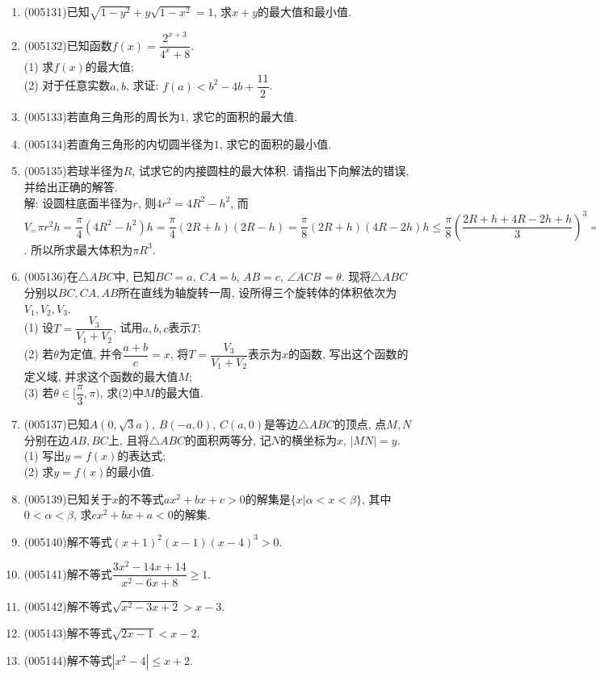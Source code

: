 \documentclass[10pt,a4paper]{article}
\begin{document}
\begin{enumerate}[1.]
\item {\tiny (005131)}已知$\sqrt{1-y^2}+y\sqrt{1-x^2}=1$, 求$x+y$的最大值和最小值.
\item {\tiny (005132)}已知函数$f(x)=\dfrac{2^{x+3}}{{4^x}+8}$.\\
(1) 求$f(x)$的最大值;\\
(2) 对于任意实数$a,b$, 求证: $f(a)<b^2-4b+\dfrac{11}2$.
\item {\tiny (005133)}若直角三角形的周长为$1$, 求它的面积的最大值.
\item {\tiny (005134)}若直角三角形的内切圆半径为$1$, 求它的面积的最小值.
\item {\tiny (005135)}若球半径为$R$, 试求它的内接圆柱的最大体积. 请指出下向解法的错误, 并给出正确的解答.\\
解: 设圆柱底面半径为$r$, 则$4r^2=4R^2-h^2$, 而$V_=\pi {r^2}h=\dfrac{\pi}4(4{R^2}-{h^2})h=\dfrac{\pi }4(2R+h)(2R-h)=\dfrac{\pi}8(2R+h)(4R-2h)h\le \dfrac{\pi}8(\dfrac{2R+h+4R-2h+h}3)^3=\dfrac{\pi}8(2R)^3=\pi R^3$. 所以所求最大体积为$\pi R^3$.
\item {\tiny (005136)}在$\triangle ABC$中, 已知$BC=a$, $CA=b$, $AB=c$, $\angle ACB=\theta$. 现将$\triangle ABC$分别以$BC,CA,AB$所在直线为轴旋转一周, 设所得三个旋转体的体积依次为$V_1,V_2,V_3$.\\
(1) 设$T=\dfrac{V_3}{V_1+V_2}$, 试用$a,b,c$表示$T$;\\
(2) 若$\theta$为定值, 并令$\dfrac{a+b}c=x$, 将$T=\dfrac{V_3}{V_1+V_2}$表示为$x$的函数, 写出这个函数的定义域, 并求这个函数的最大值$M$;\\
(3) 若$\theta \in [\dfrac{\pi }3,\pi)$, 求(2)中$M$的最大值.
\item {\tiny (005137)}已知$A(0,\sqrt 3a)$, $B(-a,0)$, $C(a,0)$是等边$\triangle ABC$的顶点, 点$M,N$分别在边$AB,BC$上, 且将$\triangle ABC$的面积两等分, 记$N$的横坐标为$x$, $|MN|=y$.\\
(1) 写出$y=f(x)$的表达式;\\
(2) 求$y=f(x)$的最小值.
\item {\tiny (005139)}已知关于$x$的不等式$ax^2+bx+c>0$的解集是$\{x|\alpha<x<\beta\}$, 其中$0<\alpha<\beta$, 求$cx^2+bx+a<0$的解集.
\item {\tiny (005140)}解不等式$(x+1)^2(x-1)(x-4)^3>0$.
\item {\tiny (005141)}解不等式$\dfrac{3x^2-14x+14}{x^2-6x+8}\ge 1$.
\item {\tiny (005142)}解不等式$\sqrt{x^2-3x+2}>x-3$.
\item {\tiny (005143)}解不等式$\sqrt{2x-1}<x-2$.
\item {\tiny (005144)}解不等式$|x^2-4|\le x+2$.

\end{enumerate}
\end{document}
